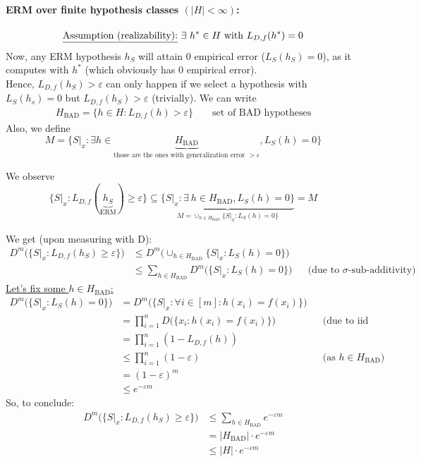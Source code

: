 \documentclass[10pt,a4paper]{article}
\theoremstyle{definition}
\theoremstyle{plain}
\begin{document}
\paragraph{ERM over finite hypothesis classes $(\big|H\big| < \infty)$:} 
$$\text{\underline{Assumption (realizability):} } \exists \ h^*\in H \text{ with } L_{D,f}(h^*) = 0$$
Now, any ERM hypothesis $h_S$ will attain 0 empirical error ($L_S(h_S) = 0$), as it computes with $h^*$ (which obviously has 0 empirical error).\\
\newline
Hence, $L_{D,f}(h_S) > \varepsilon$ can only happen if we select a hypothesis with $L_S(h_s) = 0$ but $L_{D,f}(h_S) > \varepsilon$ (trivially). We can write
\begin{align*}
	H_\text{BAD} = \{h \in H: L_{D,f}(h)>\varepsilon\} && \text{ set of BAD hypotheses}
\end{align*}
Also, we define
$$
	M = \{S|_x : \exists h \in \underbrace{H_{\text{BAD}}}_{\text{those are the ones with generalization error $> \varepsilon$}}, L_S(h) = 0  \}
$$

We observe
$$
\big\{S|_x : L_{D,f}(\underbrace{h_S}_{\text{ERM}}) \geq \varepsilon\big\} \subseteq  \underbrace{\big\{S|_x : \exists \ h \in H_{\text{BAD}}, L_S(h) = 0 \big\}}_{M = \cup_{h \in H_{\text{BAD}}}\{S|_x: L_{S}(h) = 0\} } = M
$$

We get (upon measuring with D):
\begin{align*}
D^m \big( \{S|_x : L_{D,f}(h_S) \geq \varepsilon\}\big) &\leq D^m\big( \cup_{h \in H_{\text{BAD}}}\{S|_x : L_{S}(h) = 0\} \big)\\
&\leq \sum_{h \in H_{\text{BAD}}} D^m \big(\{S|_x : L_{S}(h) = 0\}\big) && \text{(due to $\sigma$-sub-additivity)}
\end{align*}
\underline{Let's fix some $h \in H_{\text{BAD}}$:}
\begin{align*}
	D^m \big(\{S|_x : L_{S}(h) = 0\}\big) &= D^m \big(\{S|_x : \forall i \in [m]: h(x_i) = f(x_i)\}\big)\\
	&= \prod_{i = 1}^{n} D \big(\{x_i: h(x_i) = f(x_i)\}\big) && \text{(due to iid assumption)}\\
	&= \prod_{i=1}^{n} (1 - L_{D,f}(h))\\
	&\leq \prod_{i=1}^{n} (1-\varepsilon) && \text{(as $h \in H_{\text{BAD}}$)}\\
	&= (1-\varepsilon)^m \\
	&\leq e^{-\varepsilon m}
\end{align*}
So, to conclude:
\begin{align*}
	D^m \big(\{S|_x : L_{D,f}(h_S) \geq \varepsilon\}\big) &\leq \sum_{h \in H_{\text{BAD}}} e^{-\varepsilon m} \\ 
	&= |H_{\text{BAD}}| \cdot e^{-\varepsilon m} \\
	&\leq |H| \cdot e^{-\varepsilon m}
\end{align*}
\end{document}
